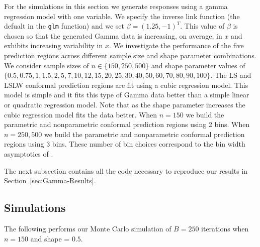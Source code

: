 \documentclass[11pt]{article}\usepackage[]{graphicx}\usepackage[]{color}
\begin{document}
For the simulations in this section we generate responses using a gamma 
regression model with one variable.  We specify the inverse link function 
(the defualt in the \texttt{glm} function) and we set 
$\beta = (1.25, -1)^T$.  This value of $\beta$ is chosen so that the generated 
Gamma data is increasing, on average, in $x$ and exhibits increasing 
variability in $x$.  We investigate the performance of the five prediction 
regions across different sample size and shape parameter combinations.  We 
consider sample sizes of $n \in \{150, 250, 500\}$ and shape parameter values 
of $\{0.5, 0.75, 1, 1.5, 2, 5, 7, 10, 12, 15, 20, 25, 30, 40, 50, 60, 70, 80, 90, 100\}$.  
The LS and LSLW conformal prediction regions are fit using a cubic regression 
model.  This model is simple and it fits this type of Gamma data better than a 
simple linear or quadratic regression model.  Note that as the shape parameter 
increases the cubic regression model fits the data better.  When $n = 150$ we 
build the parametric and nonparametric conformal prediction regions using 2 
bins.  When $n = 250, 500$ we build the parametric and nonparametric conformal 
prediction regions using 3 bins.  These number of bin choices correspond to 
the bin width asymptotics of \citet{lei2014distribution}.

The next subsection contains all the code necessary to reproduce our results 
in Section~\ref{sec:Gamma-Results}.



\subsection{Simulations}

The following performs our Monte Carlo simulation of $B = 250$ iterations 
when $n = 150$ and shape = $0.5$.
\end{document}
